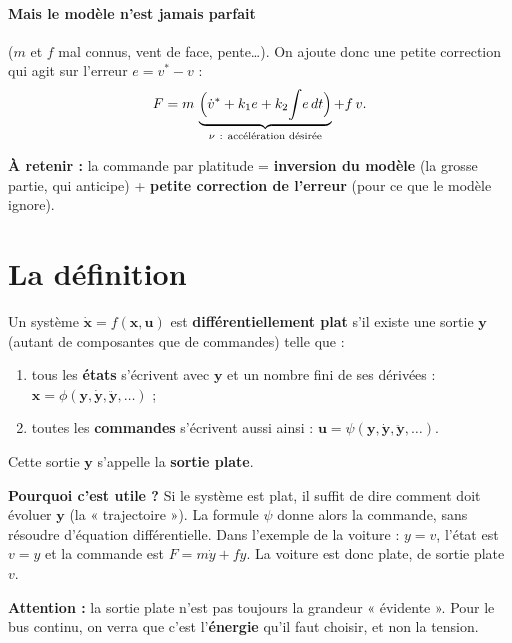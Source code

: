\documentclass[11pt,a4paper]{article}
\newcommand{\bv}[1]{\boldsymbol{#1}}
\begin{document}
\paragraph{Mais le modèle n'est jamais parfait} ($m$ et $f$ mal connus, vent de face, pente…). On ajoute
donc une petite correction qui agit sur l'erreur $e = v^* - v$ :
\begin{equation}
F = m\,\underbrace{\Bigl(\dot v^* + k_1 e + k_2\!\int\! e\,dt\Bigr)}_{\nu\ \text{: accélération désirée}} + f\,v .
\end{equation}

\begin{resume}
\textbf{À retenir :} la commande par platitude = \textbf{inversion du modèle} (la grosse partie, qui
anticipe) + \textbf{petite correction de l'erreur} (pour ce que le modèle ignore).
\end{resume}

\section{La définition}

Un système $\dot{\bv{x}} = f(\bv{x},\bv{u})$ est \textbf{différentiellement plat} s'il existe une sortie
$\bv{y}$ (autant de composantes que de commandes) telle que :
\begin{enumerate}
\item tous les \textbf{états} s'écrivent avec $\bv{y}$ et un nombre fini de ses dérivées :
      $\bv{x} = \phi(\bv{y}, \dot{\bv{y}}, \ddot{\bv{y}}, \dots)$ ;
\item toutes les \textbf{commandes} s'écrivent aussi ainsi :
      $\bv{u} = \psi(\bv{y}, \dot{\bv{y}}, \ddot{\bv{y}}, \dots)$.
\end{enumerate}
Cette sortie $\bv{y}$ s'appelle la \textbf{sortie plate}.

\begin{idee}
\textbf{Pourquoi c'est utile ?} Si le système est plat, il suffit de dire comment doit évoluer $\bv{y}$
(la « trajectoire »). La formule $\psi$ donne alors la commande, sans résoudre d'équation différentielle.
Dans l'exemple de la voiture : $y = v$, l'état est $v = y$ et la commande est $F = m\dot y + f y$.
La voiture est donc plate, de sortie plate $v$.
\end{idee}

\begin{attention}
\textbf{Attention :} la sortie plate n'est pas toujours la grandeur « évidente ». Pour le bus continu,
on verra que c'est l'\textbf{énergie} qu'il faut choisir, et non la tension.
\end{attention}
\end{document}
